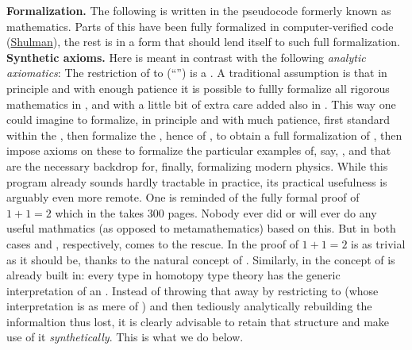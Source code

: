  
\textbf{Formalization.} The following is written in the pseudocode formerly known as mathematics. Parts of this have been fully formalized in computer-verified code (\hyperlink{Shulman}{Shulman}), the rest is in a form that should lend itself to such full formalization.
\textbf{Synthetic axioms.} Here  is meant in contrast with the following \emph{analytic axiomatics}: The restriction of  to  (``'') is a . A traditional assumption is that in principle and with enough patience it is possible to fullly formalize all rigorous mathematics in , and with a little bit of extra care added also in . This way one could imagine to formalize, in principle and with much patience, first standard  within the , then formalize the , hence of , to obtain a full formalization of , then impose axioms on these to formalize the particular examples of, say, ,  and  that are the necessary backdrop for, finally, formalizing modern physics.
While this program already sounds hardly tractable in practice, its practical usefulness is arguably even more remote. One is reminded of the fully formal proof of $1+1 = 2$ which in the  takes 300 pages. Nobody ever did or will ever do any useful mathmatics (as opposed to metamathematics) based on this.
But in both cases  and , respectively, comes to the rescue. In  the proof of $1+1 = 2$ is as trivial as it should be, thanks to the natural concept of . Similarly, in  the concept of  is already built in: every type in homotopy type theory has the generic interpretation of an . Instead of throwing that away by restricting to  (whose interpretation is as mere  of ) and then tediously analytically rebuilding the informaltion thus lost, it is clearly advisable to retain that structure and make use of it \emph{synthetically}. This is what we do below.
